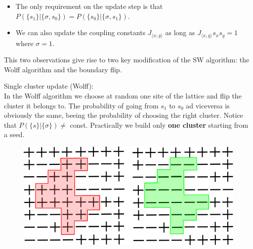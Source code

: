 \documentclass[12pt,handout]{beamer}
\begin{document}
\begin{frame}
\begin{center}

{\large
\begin{itemize}

\item The only requirement on the update step is that  $P \left( \lbrace s_1 \rbrace | \lbrace \sigma, s_0 \rbrace \right) = P \left( \lbrace s_0 \rbrace | \lbrace \sigma, s_1 \rbrace \right)$.
\item We can also update the coupling constants $J_{\langle x, y \rangle}$ as long as $J_{\langle x, y \rangle} s_x s_y = 1$ where $\sigma = 1$.

\end{itemize}}

\vspace{30pt}

This two observations give rise to two key modification of the SW algorithm: the Wolff algorithm and the boundary flip.

\end{center}
\end{frame}

\begin{frame}
\begin{center}
{
\Large Single cluster update (Wolff):\\
}
\vspace{10pt}
In the Wolff algorithm we choose at random one site of the lattice and flip the cluster it belongs to. The probability of going from $s_1$ to $s_0$ ad viceversa is obviously the same, beeing the probability of choosing the right cluster. Notice that $P \left( \lbrace s \rbrace | \lbrace \sigma \rbrace \right) \neq$ const. Practically we build only \textbf{one cluster} starting from a seed.\\

\begin{figure}[!htb]
\centering
\includegraphics[scale=0.4]{wolff.png}
\end{figure}


\end{center}
\end{frame}
\end{document}

